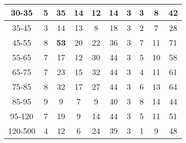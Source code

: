 \begin{frame}
\begin{table}[h]
\begin{center}
\begin{tabular}{|c|c|c|c|c|c|c|c|c|c|}
    30-35 & 5 & {\color{blue}\bfseries{35}} & 14 & 12 & 14 & 3 & 3 & 8 & 42 \\ \hline
    35-45 & 3 & 14 & 13 & 8 & 18 & 3 & 2 & 7 & 28 \\ \hline
    45-55 & 8 & {\color{blue}\bfseries{53}} & 20 & 22 & 36 & 3 & 7 & 11 & 71 \\ \hline
    55-65 & 7 & 17 & 12 & 30 & 44 & 3 & 5 & 10 & 58 \\ \hline
    65-75 & 7 & 23 & 15 & 32 & 44 & 3 & 4 & 11 & 61 \\ \hline
    75-85 & 8 & 32 & 17 & 27 & 44 & 3 & 6 & 13 & 64 \\ \hline
    85-95 & 9 & 9 & 7 & 9 & 40 & 3 & 8 & 14 & 44 \\ \hline
    95-120 & 7 & 19 & 9 & 14 & 44 & 3 & 5 & 11 & 51 \\ \hline
    120-500 & 4 & 12 & 6 & 24 & 39 & 3 & 1 & 9 & 48 \\ \hline
  \end{tabular}
  \label{tab:systInPercent_ELECTRON_WGamma}
  \end{center}
\end{table}
\end{frame}%

